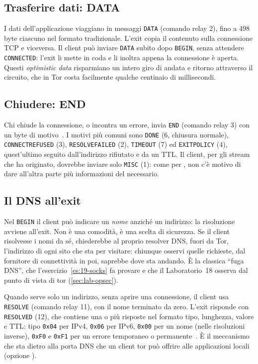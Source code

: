 \subsection{Trasferire dati: DATA}

I dati dell'applicazione viaggiano in messaggi \texttt{DATA} (comando relay 2), fino a 498 byte ciascuno nel formato tradizionale. L'exit copia il contenuto sulla connessione TCP e viceversa. Il client può inviare \texttt{DATA} subito dopo \texttt{BEGIN}, senza attendere \texttt{CONNECTED}: l'exit li mette in coda e li inoltra appena la connessione è aperta. Questi \emph{optimistic data} risparmiano un intero giro di andata e ritorno attraverso il circuito, che in Tor costa facilmente qualche centinaio di millisecondi.

\subsection{Chiudere: END}

Chi chiude la connessione, o incontra un errore, invia \texttt{END} (comando relay 3) con un byte di motivo~. I motivi più comuni sono \texttt{DONE} (6, chiusura normale), \texttt{CONNECTREFUSED} (3), \texttt{RESOLVEFAILED} (2), \texttt{TIMEOUT} (7) ed \texttt{EXITPOLICY} (4), quest'ultimo seguito dall'indirizzo rifiutato e da un TTL. Il client, per gli stream che ha originato, dovrebbe inviare solo \texttt{MISC} (1): come per , non c'è motivo di dare all'altra parte più informazioni del necessario.

\subsection{Il DNS all'exit}\label{sec:stream-dns}

Nel \texttt{BEGIN} il client può indicare un \emph{nome} anziché un indirizzo: la risoluzione avviene all'exit. Non è una comodità, è una scelta di sicurezza. Se il client risolvesse i nomi da sé, chiederebbe al proprio resolver DNS, fuori da Tor, l'indirizzo di ogni sito che sta per visitare: chiunque osservi quelle richieste, dal fornitore di connettività in poi, saprebbe dove sta andando. È la classica \enquote{fuga DNS}, che l'esercizio~\ref{es:19-socks} fa provare e che il Laboratorio~18 osserva dal punto di vista di tor (\cref{sec:lab-opsec}).

Quando serve solo un indirizzo, senza aprire una connessione, il client usa \texttt{RESOLVE} (comando relay 11), con il nome terminato da zero. L'exit risponde con \texttt{RESOLVED} (12), che contiene una o più risposte nel formato tipo, lunghezza, valore e TTL: tipo \texttt{0x04} per IPv4, \texttt{0x06} per IPv6, \texttt{0x00} per un nome (nelle risoluzioni inverse), \texttt{0xF0} e \texttt{0xF1} per un errore temporaneo o permanente~. È il meccanismo che sta dietro alla porta DNS che un client tor può offrire alle applicazioni locali (opzione ).

